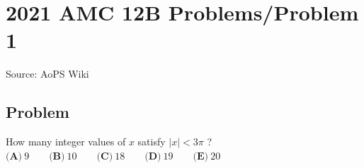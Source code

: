 \documentclass[12pt]{article}
\begin{document}
\section*{{2021 AMC 12B Problems/Problem 1}}
Source: AoPS Wiki

\subsection*{Problem}
How many integer values of $x$ satisfy $|x|<3\pi$ ? $\textbf{(A)} ~9 \qquad\textbf{(B)} ~10 \qquad\textbf{(C)} ~18 \qquad\textbf{(D)} ~19 \qquad\textbf{(E)} ~20$
\end{document}
